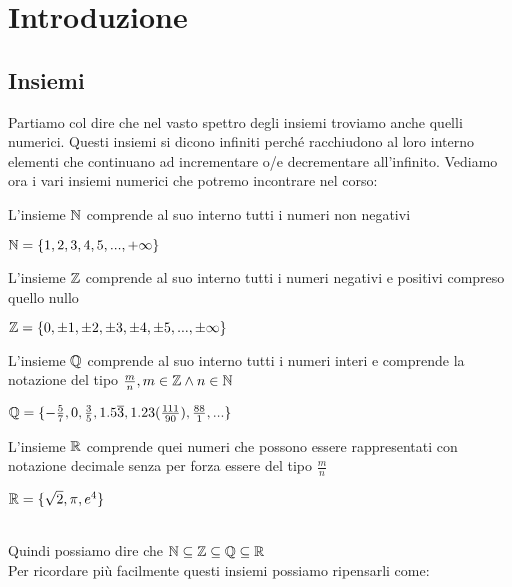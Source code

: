 \chapter{Introduzione}
\section{Insiemi}
Partiamo col dire che nel vasto spettro degli insiemi troviamo anche
quelli numerici. Questi insiemi si dicono infiniti
perché racchiudono al loro interno elementi che continuano ad
incrementare o/e decrementare all'infinito. Vediamo ora i
vari insiemi numerici che potremo incontrare nel corso:\\
\begin{definizione}\label{nnaturali}
  L'insieme $\mathbb{\MakeUppercase{n}}$ comprende al suo interno
  tutti i numeri non negativi\\
  \begin{es}
    $\mathbb{\MakeUppercase{n}}=\{1,2,3,4,5,...,+\infty\}$
  \end{es}
\end{definizione}

\begin{definizione}\label{ninteri}
  L'insieme $\mathbb{\MakeUppercase{z}}$ comprende al suo interno
  tutti i numeri negativi e positivi compreso quello nullo\\
  \begin{es}
    $\mathbb{\MakeUppercase{z}}=\{0,\pm1,\pm2,\pm3,\pm4,\pm5,...,\pm\infty\}$
  \end{es}
\end{definizione}

\begin{definizione}\label{nrazionali}
  L'insieme $\mathbb{\MakeUppercase{q}}$ comprende al suo interno
  tutti i numeri interi e comprende la notazione del tipo
  $\frac{m}{n}, m\in\mathbb{\MakeUppercase{z}} \wedge
  n\in\mathbb{\MakeUppercase{n}}$\\
  \begin{es}
    $\mathbb{\MakeUppercase{q}}=\{-\frac{5}{7},0,\frac{3}{5},1.5\overline{3},1.23(\frac{111}{90}),\frac{88}{1},...\}$
  \end{es}
\end{definizione}

\begin{definizione}\label{nreali}
  L'insieme $\mathbb{\MakeUppercase{r}}$ comprende quei numeri che
  possono essere rappresentati con notazione decimale senza per forza
  essere del tipo $\frac{m}{n}$ \\
  \begin{es}
    $\mathbb{\MakeUppercase{r}}=\{\sqrt{2},\pi,e^{4}\}$
  \end{es}
\end{definizione}
\leavevmode\\
Quindi possiamo dire che
$\mathbb{\MakeUppercase{n}}\subseteq\mathbb{\MakeUppercase{z}}\subseteq\mathbb{\MakeUppercase{q}}\subseteq\mathbb{\MakeUppercase{r}}$
\leavevmode\\
Per ricordare più facilmente questi insiemi possiamo ripensarli come:

